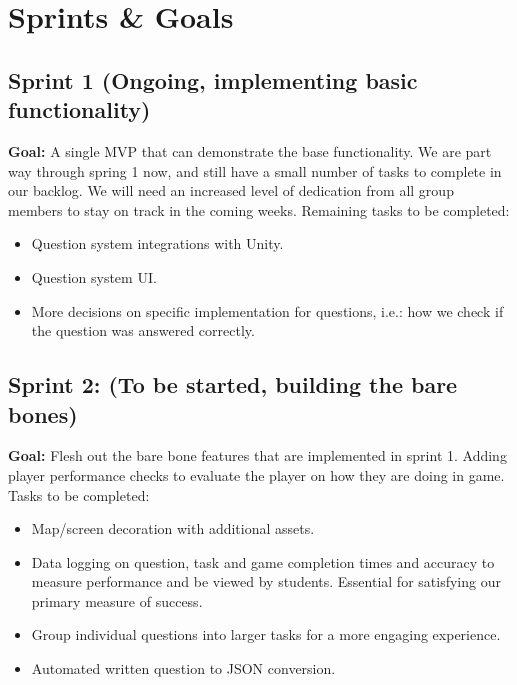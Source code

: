 \documentclass{article}
\begin{document}
\section{Sprints \& Goals}

\subsection*{Sprint 1 (Ongoing, implementing basic functionality)}
\textbf{Goal:} A single MVP that can demonstrate the base functionality.
\newline
We are part way through spring 1 now, and still have a small number of tasks to complete in our backlog. We will need an increased level of dedication from all group members to stay on track in the coming weeks.
\newline\newline
Remaining tasks to be completed:
\begin{itemize}
    \item Question system integrations with Unity.
    \item Question system UI.
    \item More decisions on specific implementation for questions, i.e.: how we check if the question was answered correctly.
\end{itemize}


\subsection*{Sprint 2: (To be started, building the bare bones)}
\textbf{Goal:} Flesh out the bare bone features that are implemented in sprint 1. Adding player performance checks to evaluate the player on how they are doing in game.
\newline\newline
Tasks to be completed:
\begin{itemize}
    \item Map/screen decoration with additional assets.
    \item Data logging on question, task and game completion times and accuracy to measure performance and be viewed by students. Essential for satisfying our primary measure of success.
    \item Group individual questions into larger tasks for a more engaging experience.
    \item Automated written question to JSON conversion.
\end{itemize}
\end{document}
